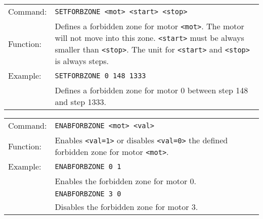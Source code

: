 \vspace{\vdistace}

\begin{table}[!htbp]
  \begin{tabularx}{\textwidth}{lX}
    Command:  & \texttt{SETFORBZONE <mot> <start> <stop>}\\
    Function: & Defines a forbidden zone for motor \texttt{<mot>}.
                The motor will not move into this zone. \texttt{<start>} must
                be always smaller than \texttt{<stop>}. The unit for \texttt{<start>}
                and \texttt{<stop>} is always steps.\\
    Example:  & \texttt{SETFORBZONE 0 148 1333}\\
              & Defines a forbidden zone for motor 0 between step 148 and step 1333.
  \end{tabularx}
\end{table}

\vspace{\vdistace}

\begin{table}[!htbp]
  \begin{tabularx}{\textwidth}{lX}
    Command:  & \texttt{ENABFORBZONE <mot> <val>}\\
    Function: & Enables \texttt{<val=1>} or disables \texttt{<val=0>} the
                defined forbidden zone for motor \texttt{<mot>}.\\
    Example:  & \texttt{ENABFORBZONE 0 1}\\
              & Enables the forbidden zone for motor 0.\\
              & \texttt{ENABFORBZONE 3 0}\\
              & Disables the forbidden zone for motor 3.
  \end{tabularx}
\end{table}

\vspace{\vdistace}

